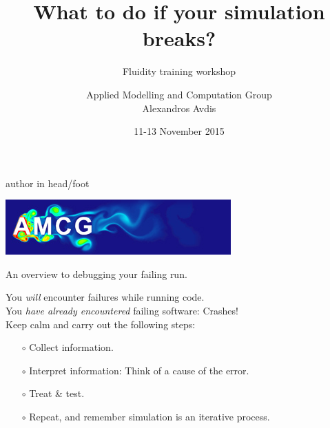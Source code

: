 \documentclass[t]{beamer}
\author[Alexandros Avdis]{Applied Modelling and Computation Group\\[15pt]Alexandros Avdis}
\institute{Department of Earth Science and Engineering, Imperial College London}
\date{11-13 November 2015}
\title[What to do if your simulation breaks?]{What to do if your simulation breaks?}
\subtitle[]{Fluidity training workshop}
\begin{document}
{%
\begin{beamercolorbox}[ht=.35cm,dp=0.2cm,wd=\textwidth,leftskip=.3cm]{author in head/foot}%
        \begin{minipage}[c]{5cm}%
        \end{minipage}\hfill%
        \begin{minipage}{6cm}
        \hfill\includegraphics[height=.5cm]{AMCGFlow-long}
        \end{minipage}
\end{beamercolorbox}%
}
\begin{frame}
\titlepage
\end{frame}


\begin{frame}{An overview to debugging your failing run.}

You \emph{will} encounter failures while running code.\\
\vspace{1ex}
You \emph{have already encountered} failing software: Crashes!\\
\vspace{1ex}
Keep calm and carry out the following steps:
\vspace{1ex}

\begin{itemize}
 \item[$\circ$] Collect information.
 \item[$\circ$] Interpret information: Think of a cause of the error.
 \item[$\circ$] Treat \& test.
 \item[$\circ$] Repeat, and remember simulation is an iterative process.
\end{itemize}

\end{frame}

\end{document}
